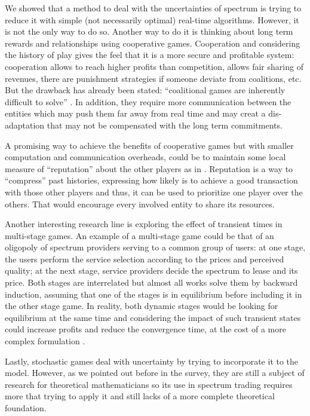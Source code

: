We showed that a method to deal with the uncertainties of spectrum is trying to reduce it with simple (not necessarily optimal) real-time algorithms. 
However, it is not the only way to do so. 
Another way to do it is thinking about long term rewards and relationships using cooperative games. 
Cooperation and considering the history of play gives the feel that it is a more secure and profitable system: cooperation allows to reach higher profits than competition, allows fair sharing of revenues, there are punishment strategies if someone deviate from coalitions, etc. 
But the drawback has already been stated: ``coalitional games are inherently difficult to solve'' \cite{ref:Li2011}.  In addition, they require more communication between the entities which may push them far away from real time and may creat a dis-adaptation that may not be compensated with the long term commitments. 

A promising way to achieve the benefits of cooperative games but with smaller computation and communication overheads, could be to maintain some local measure of ``reputation'' about the other players as in \cite{ref:Yan2011}.
Reputation is a way to ``compress'' past histories, expressing how likely is to achieve a good transaction with those other players and thus, it can be used to prioritize one player over the others. 
That would encourage every involved entity to share its resources. 

Another interesting research line is exploring the effect of transient times in multi-stage games. 
An example of a multi-stage game could be that of an oligopoly of spectrum providers serving to a common group of users: at one stage, the users perform the service selection according to the prices and perceived quality; at the next stage, service providers decide the spectrum to lease and its price. 
Both stages are interrelated but almost all works solve them by backward induction, assuming that one of the stages is in equilibrium before including it in the other stage game. 
In reality, both dynamic stages would be looking for equilibrium at the same time and considering the impact of such transient states could increase profits and reduce the convergence time, at the cost of a more complex formulation \cite{ref:Zhu2012_Dyn}.

Lastly, stochastic games deal with uncertainty by trying to incorporate it to the model. 
However, as we pointed out before in the survey, they are still a subject of research for theoretical mathematicians so its use in spectrum trading requires more that trying to apply it and still lacks of a more complete theoretical foundation. 

